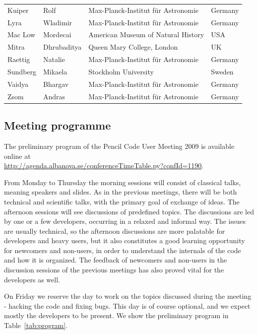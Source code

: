 \documentclass{article}
\begin{document}
\begin{table}
\begin{center}
\begin{tabular}{llll}
    Kuiper      &  Rolf        &  Max-Planck-Institut f\"ur Astronomie & Germany\\
    Lyra        &  Wladimir    &  Max-Planck-Institut f\"ur Astronomie & Germany\\
    Mac Low     &  Mordecai    &  American Museum of Natural History & USA\\
    Mitra       &  Dhrubaditya &  Queen Mary College, London & UK \\
    Raettig     &  Natalie     &  Max-Planck-Institut f\"ur Astronomie & Germany\\
    Sundberg    &  Mikaela     &  Stockholm University & Sweden\\
    Vaidya      &  Bhargav     &  Max-Planck-Institut f\"ur Astronomie & Germany\\
    Zsom        &  Andras      &  Max-Planck-Institut f\"ur Astronomie & Germany\\\hline  
\end{tabular}
\end{center}
\end{table}

\subsection*{Meeting programme}

The preliminary program of the {\sc Pencil Code} User Meeting 2009 is available online at \\

\url{http://agenda.albanova.se/conferenceTimeTable.py?confId=1190}. 

From Monday 
to Thursday the morning sessions will consist of classical talks, meaning speakers 
and slides. As in the previous meetings, there will be both technical and scientific 
talks, with the primary goal of exchange of ideas. The afternoon sessions will see discussions of predefined topics. The discussions are led by one or a few
developers, occurring in a relaxed and informal way. The issues are usually technical, so the afternoon discussions 
are more palatable for developers and heavy users, but it also constitutes a good 
learning opportunity for newcomers and non-users, in order to understand the 
internals of the code and how it is organized. The feedback of newcomers and non-users 
in the discussion sessions of the previous meetings has also proved vital for the 
developers as well.

On Friday we reserve the day to work on the topics discussed during the meeting - hacking the 
code and fixing bugs. This day is of course optional, and we expect mostly the developers to be 
present. We show the preliminary program in Table~\ref{tab:program}.
\\ 
\end{document}
